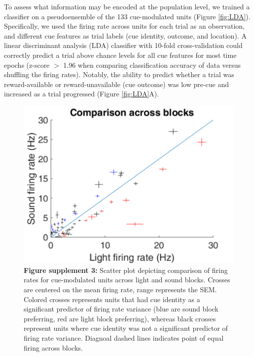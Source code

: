 \documentclass[11pt]{article}
\newcommand{\bsf}[1]{\textbf{#1}}
\begin{document}
To assess what information may be encoded at the population level, we
trained a classifier on a pseudoensemble of the 133 cue-modulated
units (Figure \ref{fig:LDA}). Specifically, we used the firing rate
across units for each trial as an observation, and different cue
features as trial labels (cue identity, outcome, and location). A
linear discriminant analysis (LDA) classifier with 10-fold
cross-validation could correctly predict a trial above chance levels
for all cue features for most time epochs (z-score $>$ 1.96 when
comparing classification accuracy of data versus shuffling the firing
rates). Notably, the ability to predict whether a trial was
reward-available or reward-unavailable (cue outcome) was low pre-cue
and increased as a trial progressed (Figure \ref{fig:LDA}A).

 \begin{figure}[ht!]
\centering
\includegraphics[height=0.3\textheight]{Fig 5 - SUPP scatter.pdf}
\caption*{\bsf{Figure supplement 3:} Scatter plot depicting comparison
  of firing rates for cue-modulated units across light and sound
  blocks. Crosses are centered on the mean firing rate, range
  represents the SEM. Colored crosses represents units that had cue
  identity as a significant predictor of firing rate variance (blue
  are sound block preferring, red are light block preferring), whereas
  black crosses represent units where cue identity was not a
  significant predictor of firing rate variance. Diagnoal dashed lines
  indicates point of equal firing across blocks.}
\label{fig:Q1SUPP3}
\end{figure} \clearpage
\end{document}
